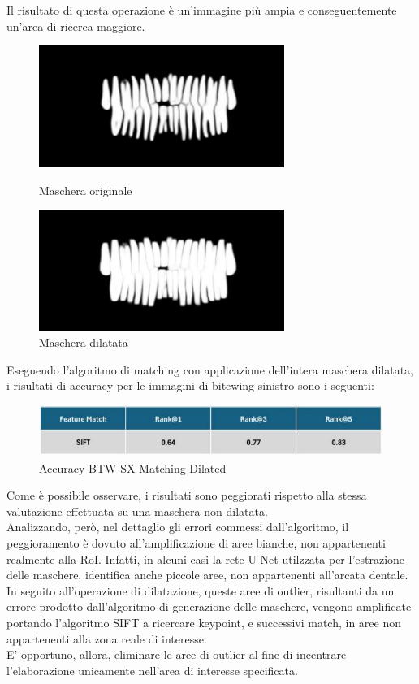 \documentclass[12pt,a4paper,openright,twoside]{book}
\begin{document}
Il risultato di questa operazione è un'immagine più ampia e conseguentemente un'area di ricerca maggiore.
\begin{figure}[H]
    \centering
    \begin{minipage}{0.45\textwidth}
	\centering
    	\includegraphics[width=8cm]{figures/maskoriginal.pdf}
    	\caption{Maschera originale}
    	\label{lab:Maschera Originale}
    \end{minipage}\hfill
    \begin{minipage}{0.45\textwidth}
    	\centering
    	\includegraphics[width=8cm]{figures/maskdilated.pdf}
    	\caption{Maschera dilatata}
    	\label{lab:Maschera dilatata}
    \end{minipage}\hfill
\end{figure}

Eseguendo l'algoritmo di matching con applicazione dell'intera maschera dilatata, i risultati di accuracy per le immagini di bitewing sinistro sono i seguenti:
\begin{figure}[H]
	\centering
	\includegraphics{figures/sx6.pdf}
    	\caption{Accuracy BTW SX Matching Dilated}
	\label{fig:sx6}
\end{figure}
Come è possibile osservare, i risultati sono peggiorati rispetto alla stessa valutazione effettuata su una maschera non dilatata.\\

Analizzando, però, nel dettaglio gli errori commessi dall'algoritmo, il peggioramento è dovuto all'amplificazione di aree bianche, non appartenenti realmente alla RoI. Infatti, in alcuni casi la rete U-Net utilzzata per l'estrazione delle maschere, identifica anche piccole aree, non appartenenti all'arcata dentale.\\
In seguito all'operazione di dilatazione, queste aree di outlier, risultanti da un errore prodotto dall'algoritmo di generazione delle maschere, vengono amplificate portando l'algoritmo SIFT a ricercare keypoint, e successivi match, in aree non appartenenti alla zona reale di interesse.\\
E' opportuno, allora, eliminare le aree di outlier al fine di incentrare l'elaborazione unicamente nell'area di interesse specificata.
\end{document}
